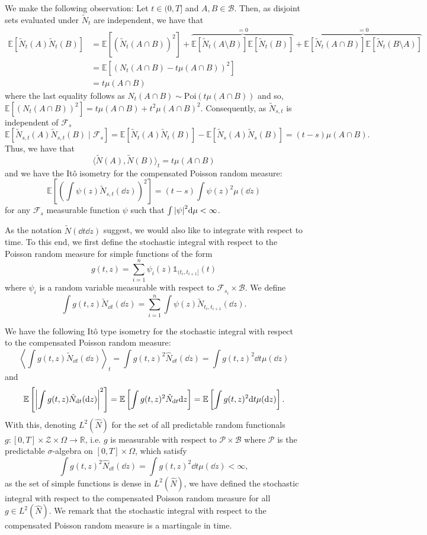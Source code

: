 \documentclass[]{article}
\theoremstyle{definition}
\theoremstyle{definition}
\begin{document}
We make the following observation: Let \(t \in (0, T]\) and \(A, B \in \mathcal{B}\). Then, as 
disjoint sets evaluated under \(\tilde N_t\) are independent, we have that 
\begin{align*}
  \mathbb{E}[\tilde N_t(A) \tilde N_t(B)] 
  & = \mathbb{E}[(\tilde N_t(A \cap B))^2] 
    + \overbrace{\mathbb{E}[\tilde N_t(A \setminus B)]\mathbb{E}[\tilde N_t(B)]}^{= 0}
    + \overbrace{\mathbb{E}[\tilde N_t(A \cap B)]\mathbb{E}[\tilde N_t(B \setminus A)]}^{= 0}\\
  & = \mathbb{E}[(N_t(A \cap B) - t\mu(A \cap B))^2]\\
  & = t\mu(A \cap B)
\end{align*}
where the last equality follows as \(N_t(A \cap B) \sim \text{Poi}(t\mu(A \cap B))\) and so, 
\(\mathbb{E}[(N_t(A \cap B))^2] = t\mu(A \cap B) + t^2 \mu(A \cap B)^2\). Consequently, as 
\(\tilde N_{s, t}\) is independent of \(\mathcal{F}_s\)
\[\mathbb{E}[\tilde N_{s, t}(A) \tilde N_{s, t}(B) \mid \mathcal{F}_s] = 
  \mathbb{E}[\tilde N_t(A) \tilde N_t(B)] - \mathbb{E}[\tilde N_s(A) \tilde N_s(B)]
  = (t - s)\mu(A \cap B).\]
Thus, we have that 
\[\langle \tilde N(A), \tilde N(B)\rangle_t = t \mu(A \cap B)\]
and we have the It\^o isometry for the compensated Poisson random measure:
\[\mathbb{E}\left[\left(\int \psi(z) \tilde N_{s, t}(\dd z)\right)^2\right] 
  = (t - s) \int \psi(z)^2 \mu(\dd z)\]
for any \(\mathcal{F}_s\) measurable function \(\psi\) such that \(\int \abs{\psi}^2 \dd\mu < \infty\).

As the notation \(\tilde N(\dd t \dd z)\) suggest, we would also like to integrate with respect to time.
To this end, we first define the stochastic integral with respect to the Poisson random measure for 
simple functions of the form 
\[g(t, z) = \sum_{i = 1}^n \psi_i(z) \mathbb{1}_{(t_i, t_{i + 1}]}(t)\]
where \(\psi_i\) is a random variable measurable with respect to \(\mathcal{F}_{s_i} \times \mathcal{B}\). We define
\[\int g(t, z) \tilde N_{\dd t}(\dd z) = \sum_{i = 1}^n \int \psi(z) \tilde N_{t_i, t_{i + 1}}(\dd z).\]

We have the following It\^o type isometry for the stochastic integral with respect to the compensated 
Poisson random measure:
\[\left\langle \int g(t, z) \tilde N_{\dd t}(\dd z) \right\rangle_t 
  = \int g(t, z)^2 \hat N_{\dd t}(\dd z) = \int g(t, z)^2 \dd t \mu(\dd z)\]
and 
\[\mathbb{E}\left[\abs{\int g(t, z) \tilde N_{\dd t}(\dd z)}^2\right] 
  = \mathbb{E}\left[\int g(t, z)^2 \hat N_{\dd t}{\dd z}\right]
  = \mathbb{E}\left[\int g(t, z)^2 \dd t \mu(\dd z)\right].\]
With this, denoting \(L^2(\hat N)\) for the set of all predictable random functionals 
\(g : [0, T] \times \mathcal{Z} \times \Omega \to \mathbb{R}\), i.e. \(g\) is measurable with respect to
\(\mathcal{P} \times \mathcal{B}\) where \(\mathcal{P}\) is the predictable \(\sigma\)-algebra on \([0, T] \times \Omega\),
which satisfy 
\[\int g(t, z)^2 \hat N_{\dd t}(\dd z) = \int g(t, z)^2 \dd t \mu(\dd z) < \infty,\]
as the set of simple functions is dense in \(L^2(\hat N)\), we have defined the stochastic integral 
with respect to the compensated Poisson random measure for all \(g \in L^2(\hat N)\). We remark that 
the stochastic integral with respect to the compensated Poisson random measure is a martingale in time.
\end{document}

